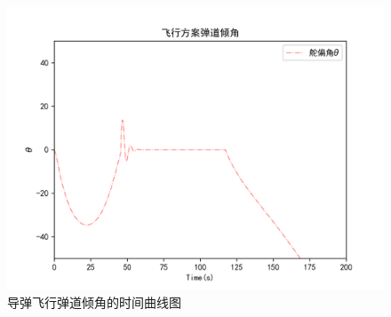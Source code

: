 \documentclass[UTF8]{ctexart}
\begin{document}
\begin{figure}[H]
    \centering
    \includegraphics[width=130mm]{code/飞行弹道倾角.png}
    \caption{导弹飞行弹道倾角的时间曲线图}
\end{figure}


\clearpage

\end{document}
